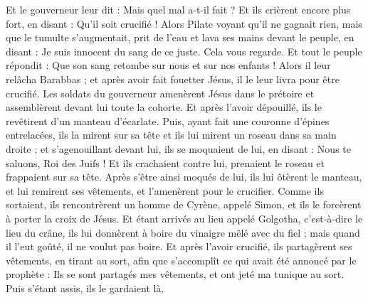 \begin{multicols}{2}
Et le gouverneur leur dit : Mais quel mal a-t-il fait ? Et ils crièrent encore plus fort, en disant : Qu'il soit crucifié !
Alors Pilate voyant qu'il ne gagnait rien, mais que le tumulte s'augmentait, prit de l'eau et lava ses mains devant le peuple, en disant : Je suis innocent du sang de ce juste. Cela vous regarde.
Et tout le peuple répondit : Que son sang retombe sur nous et sur nos enfants !
Alors il leur relâcha Barabbas ; et après avoir fait fouetter Jésus, il le leur livra pour être crucifié.
Les soldats du gouverneur amenèrent Jésus dans le prétoire et assemblèrent devant lui toute la cohorte.
Et après l'avoir dépouillé, ils le revêtirent d'un manteau d'écarlate.
Puis, ayant fait une couronne d'épines entrelacées, ils la mirent sur sa tête et ils lui mirent un roseau dans sa main droite ; et s'agenouillant devant lui, ils se moquaient de lui, en disant : Nous te saluons, Roi des Juifs !
Et ils crachaient contre lui, prenaient le roseau et frappaient sur sa tête.
Après s'être ainsi moqués de lui, ils lui ôtèrent le manteau, et lui remirent ses vêtements, et l'amenèrent pour le crucifier.
Comme ils sortaient, ils rencontrèrent un homme de Cyrène, appelé Simon, et ils le forcèrent à porter la croix de Jésus.
Et étant arrivés au lieu appelé Golgotha, c'est-à-dire le lieu du crâne,
ils lui donnèrent à boire du vinaigre mêlé avec du fiel ; mais quand il l'eut goûté, il ne voulut pas boire.
Et après l'avoir crucifié, ils partagèrent ses vêtements, en tirant au sort, afin que s'accomplît ce qui avait été annoncé par le prophète : Ils se sont partagés mes vêtements, et ont jeté ma tunique au sort.
Puis s'étant assis, ils le gardaient là.

\end{multicols}
